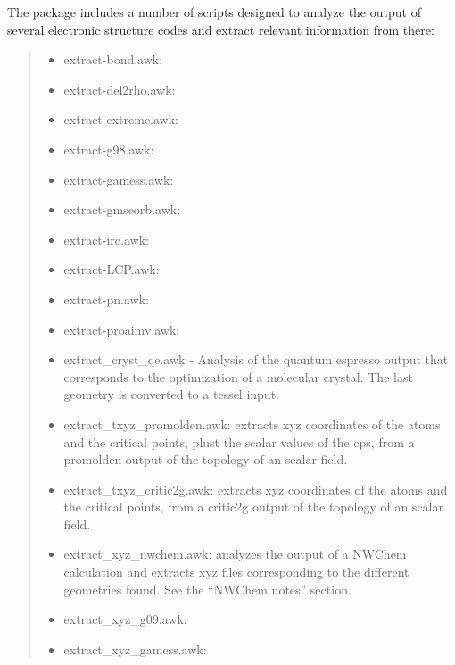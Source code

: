 \documentclass[a4paper]{article}
\begin{document}
The package includes a number of scripts designed to analyze the output of
several electronic structure codes and extract relevant information from
there:
%
\begin{quote}
%
\begin{itemize}

\item extract-bond.awk:

\item extract-del2rho.awk:

\item extract-extreme.awk:

\item extract-g98.awk:

\item extract-gamess.awk:

\item extract-gmseorb.awk:

\item extract-irc.awk:

\item extract-LCP.awk:

\item extract-pn.awk:

\item extract-proaimv.awk:

\item extract\_cryst\_qe.awk - Analysis of the quantum espresso output that
corresponds to the optimization of a molecular crystal. The last geometry
is converted to a tessel input.

\item extract\_txyz\_promolden.awk: extracts xyz coordinates of the atoms and
the critical points, plust the scalar values of the cps, from a
promolden output of the topology of an scalar field.

\item extract\_txyz\_critic2g.awk: extracts xyz coordinates of the atoms and
the critical points, from a critic2g output of the topology of an scalar
field.

\item extract\_xyz\_nwchem.awk: analyzes the output of a NWChem calculation
and extracts xyz files corresponding to the different geometries
found. See the ``NWChem notes'' section.

\item extract\_xyz\_g09.awk:

\item extract\_xyz\_gamess.awk:

\end{itemize}

\end{quote}
\end{document}
